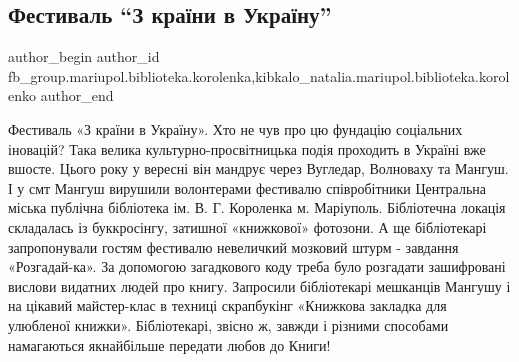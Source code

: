  
 
 
 
 

\subsection{Фестиваль \enquote{З країни в Україну}}
\label{sec:02_10_2019.fb.fb_group.mariupol.biblioteka.korolenka.1.festival__z_kra_ni_v}
 
\ifcmt
 author_begin
   author_id fb_group.mariupol.biblioteka.korolenka,kibkalo_natalia.mariupol.biblioteka.korolenko
 author_end
\fi

Фестиваль «З країни в Україну».  Хто не чув про цю фундацію соціальних
іновацій? Така велика культурно-просвітницька подія проходить в Україні вже
вшосте. Цього року у вересні він мандрує через Вугледар, Волноваху та Мангуш. І
у смт Мангуш вирушили волонтерами фестивалю співробітники Центральна міська
публічна бібліотека ім. В. Г. Короленка м. Маріуполь. Бібліотечна локація
складалась із  буккросінгу, затишної «книжкової» фотозони. А ще  бібліотекарі
запропонували гостям фестивалю невеличкий мозковий штурм - завдання
«Розгадай-ка».  За допомогою загадкового коду треба було розгадати зашифровані
вислови видатних людей про книгу. Запросили бібліотекарі мешканців Мангушу і на
цікавий майстер-клас в техниці скрапбукінг «Книжкова закладка для улюбленої
книжки». Бібліотекарі, звісно ж, завжди і різними способами намагаються
якнайбільше передати любов до Книги!
